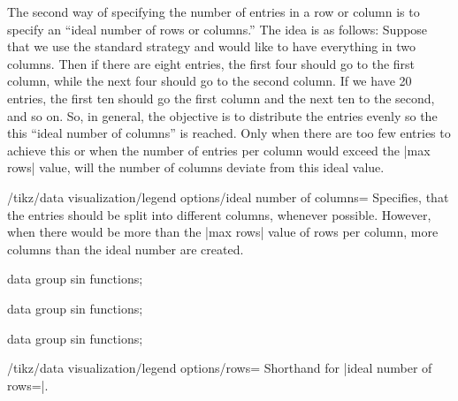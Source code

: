 The second way of specifying the number of entries in a row or column
is to specify an ``ideal number of rows or columns.'' The idea is as
follows: Suppose that we use the standard strategy and would like to
have everything in two columns. Then if there are eight entries, the
first four should go to the first column, while the next four should
go to the second column. If we have 20 entries, the first ten should
go the first column and the next ten to the second, and so on. So, in
general, the objective is to distribute the entries evenly so the this
``ideal number of columns'' is reached. Only when there are too few
entries to achieve this or when the number of entries per column would
exceed the |max rows| value, will the number of columns deviate from
this ideal value.



\begin{key}{/tikz/data visualization/legend options/ideal number of columns=}
  Specifies, that the entries should be split into 
  different columns, whenever possible. However, when there would be
  more than the |max rows| value of rows per column, more columns than
  the ideal number are created.
\begin{codeexample}[width=7cm]
\tikz \datavisualization [
  visualize as smooth line/.list={1,2,3,4,5,6,7,8},
  legend example, style sheet=vary hue,
  main legend={ideal number of columns=2}]
data group {sin functions};
\end{codeexample}  
\begin{codeexample}[width=7cm]
\tikz \datavisualization [
  visualize as smooth line/.list={1,2,3,4,5,6,7,8},
  legend example, style sheet=vary hue,
  main legend={ideal number of columns=4}]
data group {sin functions};
\end{codeexample}  
\begin{codeexample}[width=7cm]
\tikz \datavisualization [
  visualize as smooth line/.list={1,2,3,4,5,6,7,8},
  legend example, style sheet=vary hue,
  main legend={max rows=3,ideal number of columns=2}]
data group {sin functions};
\end{codeexample}  
\end{key}

\begin{key}{/tikz/data visualization/legend
    options/rows=}
  Shorthand for |ideal number of rows=|.
\end{key}


